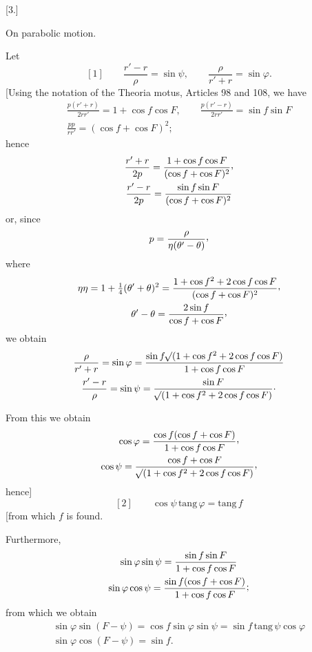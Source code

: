 \clearpage
{}
\begin{center}
[3.]\par
\medskip
On parabolic motion.\par
{}
\end{center}

Let
\[
\mathrm{[1]}\qquad \frac{r'-r}{\rho}=\sin\psi,\qquad \frac{\rho}{r'+r}=\sin\varphi.
\]
[Using the notation of the Theoria motus, Articles 98 and 108, we have
\[
\begin{gathered}
\frac{p(r'+r)}{2rr'}=1+\cos f\cos F,\qquad
\frac{p(r'-r)}{2rr'}=\sin f\sin F\\
\frac{pp}{rr'}=(\cos f+\cos F)^2;
\end{gathered}
\]
hence
\[
\begin{gathered}
\frac{r'+r}{2p}=\frac{1+\cos f\cos F}{(\cos f+\cos F)^2}\mathpunct{\raisebox{.45ex}{,}}\\
\frac{r'-r}{2p}=\frac{\sin f\sin F}{(\cos f+\cos F)^2}
\end{gathered}
\]
or, since
\[
p=\frac{\rho}{\eta(\theta'-\theta)}\mathpunct{\raisebox{.45ex}{,}}
\]
where
\[
\begin{gathered}
\eta\eta=1+\tfrac14(\theta'+\theta)^2=\frac{1+\cos f^2+2\cos f\cos F}{(\cos f+\cos F)^2}\mathpunct{\raisebox{.45ex}{,}}\\
\theta'-\theta=\frac{2\sin f}{\cos f+\cos F}\mathpunct{\raisebox{.45ex}{,}}
\end{gathered}
\]
we obtain
\[
\begin{gathered}
\frac{\rho}{r'+r}=\sin\varphi=\frac{\sin f\mathord{{}^{}\!\surd}(1+\cos f^2+2\cos f\cos F)}{1+\cos f\cos F}\\
\frac{r'-r}{\rho}=\sin\psi=\frac{\sin F}{\mathord{{}^{}\!\surd}(1+\cos f^2+2\cos f\cos F)}\mathpunct{\cdot}
\end{gathered}
\]

From this we obtain
\[
\begin{gathered}
\cos\varphi=\frac{\cos f(\cos f+\cos F)}{1+\cos f\cos F}\mathpunct{\raisebox{.45ex}{,}}\\
\cos\psi=\frac{\cos f+\cos F}{\BareRoot{(1+\cos f^2+2\cos f\cos F)}}\mathpunct{\raisebox{.45ex}{,}}
\end{gathered}
\]
hence]
\[
\mathrm{[2]}\qquad \cos\psi\,\mathrm{tang}\,\varphi=\mathrm{tang}\,f
\]
[from which \(f\) is found.

Furthermore,
\[
\begin{gathered}
\sin\varphi\sin\psi=\frac{\sin f\sin F}{1+\cos f\cos F}\\
\sin\varphi\cos\psi=\frac{\sin f(\cos f+\cos F)}{1+\cos f\cos F}\mathpunct{\raisebox{.25ex}{;}}
\end{gathered}
\]
from which we obtain
\[
\begin{gathered}
\sin\varphi\sin(F-\psi)=\cos f\sin\varphi\sin\psi=\sin f\,\mathrm{tang}\,\psi\cos\varphi\\
\sin\varphi\cos(F-\psi)=\sin f.
\end{gathered}
\]

